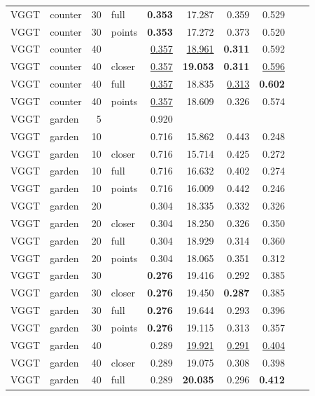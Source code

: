 \begin{table}[H]
\begin{tabular}{llrlrrrrrr}
VGGT & counter & 30 & full & \textbf{0.353} & 17.287 & 0.359 & 0.529 &  &  \\
VGGT & counter & 30 & points & \textbf{0.353} & 17.272 & 0.373 & 0.520 &  &  \\
VGGT & counter & 40 &  & \underline{0.357} & \underline{18.961} & \textbf{0.311} & 0.592 &  &  \\
VGGT & counter & 40 & closer & \underline{0.357} & \textbf{19.053} & \textbf{0.311} & \underline{0.596} &  &  \\
VGGT & counter & 40 & full & \underline{0.357} & 18.835 & \underline{0.313} & \textbf{0.602} &  &  \\
VGGT & counter & 40 & points & \underline{0.357} & 18.609 & 0.326 & 0.574 &  &  \\
\midrule
VGGT & garden & 5 &  & 0.920 &  &  &  &  &  \\
VGGT & garden & 10 &  & 0.716 & 15.862 & 0.443 & 0.248 &  &  \\
VGGT & garden & 10 & closer & 0.716 & 15.714 & 0.425 & 0.272 &  &  \\
VGGT & garden & 10 & full & 0.716 & 16.632 & 0.402 & 0.274 &  &  \\
VGGT & garden & 10 & points & 0.716 & 16.009 & 0.442 & 0.246 &  &  \\
VGGT & garden & 20 &  & 0.304 & 18.335 & 0.332 & 0.326 &  &  \\
VGGT & garden & 20 & closer & 0.304 & 18.250 & 0.326 & 0.350 &  &  \\
VGGT & garden & 20 & full & 0.304 & 18.929 & 0.314 & 0.360 &  &  \\
VGGT & garden & 20 & points & 0.304 & 18.065 & 0.351 & 0.312 &  &  \\
VGGT & garden & 30 &  & \textbf{0.276} & 19.416 & 0.292 & 0.385 &  &  \\
VGGT & garden & 30 & closer & \textbf{0.276} & 19.450 & \textbf{0.287} & 0.385 &  &  \\
VGGT & garden & 30 & full & \textbf{0.276} & 19.644 & 0.293 & 0.396 &  &  \\
VGGT & garden & 30 & points & \textbf{0.276} & 19.115 & 0.313 & 0.357 &  &  \\
VGGT & garden & 40 &  & 0.289 & \underline{19.921} & \underline{0.291} & \underline{0.404} &  &  \\
VGGT & garden & 40 & closer & 0.289 & 19.075 & 0.308 & 0.398 &  &  \\
VGGT & garden & 40 & full & 0.289 & \textbf{20.035} & 0.296 & \textbf{0.412} &  &  \\

\end{tabular}
\end{table}
